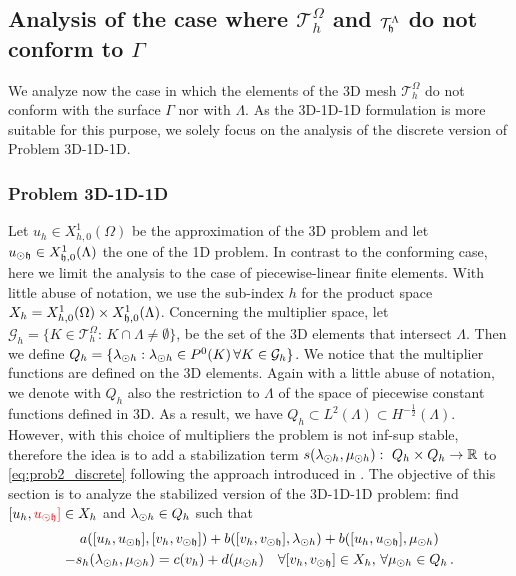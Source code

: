 \documentclass[r]{siamart171218}
\newcommand{\kent}[1]{{\color{red}#1}}
\begin{document}
\def\patch{\omega _j}
\subsection{Analysis of the case where $\mathcal{T}^{\Omega}_h$ and $\mathcal{T}^{\Lambda}_{\mathfrak{h}}$ do not conform to $\Gamma$} \label{sec:unfit2}
We analyze now the case in which the elements of the 3D mesh $\mathcal{T}^{\Omega}_h$
do not conform with the surface $\Gamma$ nor with $\Lambda$. 
As the 3D-1D-1D formulation is more suitable for this purpose,
we solely focus on the analysis of the discrete version of Problem 3D-1D-1D.

\subsubsection{Problem 3D-1D-1D} 
Let $u_h \in X_{h,0}^1(\Omega)$ be the approximation of the 3D problem
and let $u_{\odot \mathfrak{h}} \in X_{\mathfrak{h},0}^1(\Lambda)$ the one of the 1D problem.
In contrast to the conforming case, 
here we limit the analysis to the case of piecewise-linear finite elements. 
With little abuse of notation, we use the sub-index $h$ for the product space 
$X_h = X_{h,0}^1(\Omega) \times X_{\mathfrak{h},0}^1(\Lambda)$.
Concerning the multiplier space, let $\mathcal{G}_h = \{K \in \mathcal{T}^{\Omega}_h: \, K\cap \Lambda \neq \emptyset\}$, be the set of the 3D elements that intersect $\Lambda$. Then we define $Q_h=\{\lambda_{\odot h} : \lambda_{\odot h} \in P^0(K) \, \forall K \in \mathcal{G}_h\}$. We notice that the multiplier functions are defined on the 3D elements. Again with a little abuse of notation, we denote with $Q_h$ also the restriction to $\Lambda$ of the space of piecewise constant functions defined in 3D. As a result, we have $Q_h \subset L^2(\Lambda) \subset H^{-\frac12}(\Lambda)$.
However, with this choice of multipliers the problem is not inf-sup stable, therefore the idea is to add a stabilization term $s(\lambda_{\odot h}, \mu_{\odot h}): \ Q_h \times Q_h \rightarrow \mathbb{R}$ to \eqref{eq:prob2_discrete} following the approach introduced in \cite{burman2014}. 
The objective of this section is to analyze the stabilized version of the 3D-1D-1D problem: find $[u_h, \kent{\udfh]} \in X_h$ and $\lambda_{\odot h} \in Q_h$ such that
\begin{multline}\label{eq:prob2_stabilized}
a([u_h, \udfh], [v_h, \vdfh]) +
b([v_h, \vdfh], \ldh)
+ b([u_h, \udfh], \mdh)
\\
- s_h(\ldh, \mdh) 
= c(v_h) + d(\mdh)
  \quad \forall [v_h, \vdfh] \in X_h, \,
  \forall \mdh \in Q_h\,.
\end{multline}
\end{document}
